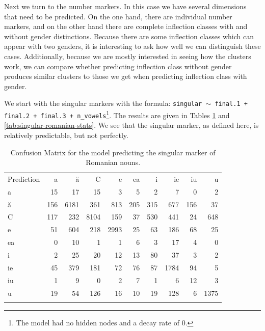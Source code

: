Next we turn to the number markers. In this case we have several dimensions that need to be predicted. On the one hand, there are individual number markers, and on the other hand there are complete inflection classes with and without gender distinctions. Because there are some inflection classes which can appear with two genders, it is interesting to ask how well we can distinguish these cases.  Additionally, because we are mostly interested in seeing how the clusters work, we can compare whether predicting inflection class without gender produces similar clusters to those we get when predicting inflection class with gender.

We start with the singular markers with the formula: \texttt{singular $\sim$ final.1 + final.2 + final.3 + n\_vowels}\footnote{The model had no hidden nodes and a decay rate of 0.}. The results are given in Tables \ref{tab:singular-romanian} and \ref{tab:singular-romanian-stats}. We see that the singular marker, as defined here, is relatively predictable, but not perfectly.

\begin{table}[!htpb]
  \centering
  \begin{tabular}{lrrrrrrrrr}
    \lsptoprule
    \multicolumn{10}{c}{Reference}                                         \\
    \midrule
    Prediction & a   & ă    & C    & e    & ea  & i   & ie   & iu  & u    \\
    a          & 15  & 17   & 15   & 3    & 5   & 2   & 7    & 0   & 2    \\
    ă          & 156 & 6181 & 361  & 813  & 205 & 315 & 677  & 156 & 37   \\
    C          & 117 & 232  & 8104 & 159  & 37  & 530 & 441  & 24  & 648  \\
    e          & 51  & 604  & 218  & 2993 & 25  & 63  & 186  & 68  & 25   \\
    ea         & 0   & 10   & 1    & 1    & 6   & 3   & 17   & 4   & 0    \\
    i          & 2   & 25   & 20   & 12   & 13  & 80  & 37   & 3   & 2    \\
    ie         & 45  & 379  & 181  & 72   & 76  & 87  & 1784 & 94  & 5    \\
    iu         & 1   & 9    & 0    & 2    & 7   & 1   & 6    & 12  & 3    \\
    u          & 19  & 54   & 126  & 16   & 10  & 19  & 128  & 6   & 1375 \\
    \lspbottomrule
  \end{tabular}
  \caption{Confusion Matrix for the model predicting the singular marker of Romanian nouns.}\label{tab:singular-romanian}
\end{table}

